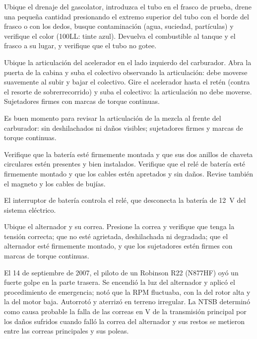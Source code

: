 Ubique el drenaje del gascolator, introduzca el tubo en el frasco de prueba, drene una pequeña cantidad presionando el extremo superior del tubo con el borde del frasco o con los dedos, busque contaminación (agua, suciedad, partículas) y verifique el color (100LL: tinte azul). Devuelva el combustible al tanque y el frasco a su lugar, y verifique que el tubo no gotee.

Ubique la articulación del acelerador en el lado izquierdo del carburador. Abra la puerta de la cabina y suba el colectivo observando la articulación: debe moverse suavemente al subir y bajar el colectivo. Gire el acelerador hasta el retén (contra el resorte de sobrerrecorrido) y suba el colectivo: la articulación no debe moverse. Sujetadores firmes con marcas de torque continuas.

\begin{nota}
Es buen momento para revisar la articulación de la mezcla al frente del carburador: sin deshilachados ni daños visibles; sujetadores firmes y marcas de torque continuas.
\end{nota}

Verifique que la batería esté firmemente montada y que sus dos anillos de chaveta circulares estén presentes y bien instalados. Verifique que el relé de batería esté firmemente montado y que los cables estén apretados y sin daños. Revise también el magneto y los cables de bujías.

\begin{nota}
El interruptor de batería controla el relé, que desconecta la batería de 12~V del sistema eléctrico.
\end{nota}

Ubique el alternador y su correa. Presione la correa y verifique que tenga la tensión correcta; que no esté agrietada, deshilachada ni degradada; que el alternador esté firmemente montado, y que los sujetadores estén firmes con marcas de torque continuas.

\begin{caso}
El 14 de septiembre de 2007, el piloto de un Robinson R22 (N877HF) oyó un fuerte golpe en la parte trasera. Se encendió la luz del alternador y aplicó el procedimiento de emergencia; notó que la RPM fluctuaba, con la del rotor alta y la del motor baja. Autorrotó y aterrizó en terreno irregular. La NTSB determinó como causa probable la falla de las correas en V de la transmisión principal por los daños sufridos cuando falló la correa del alternador y sus restos se metieron entre las correas principales y sus poleas.
\end{caso}

